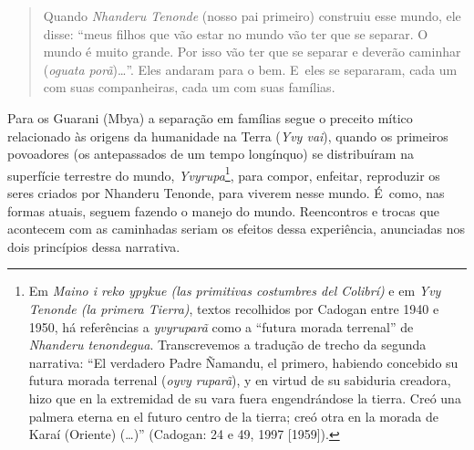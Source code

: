 \begin{quote}
Quando \emph{Nhanderu Tenonde} (nosso pai primeiro) construiu esse mundo, ele
disse: ``meus filhos que vão estar no mundo vão ter que se separar. O
mundo é muito grande. Por isso vão ter que se separar e deverão
caminhar (\emph{oguata porã})\ldots{}''. Eles andaram para o bem. E~eles se
separaram, cada um com suas companheiras, cada um com suas famílias. 
\end{quote}

Para os Guarani (Mbya) a separação em famílias segue o preceito mítico
relacionado às origens da humanidade na Terra (\emph{Yvy vai}), quando os
primeiros povoadores (os antepassados de um tempo longínquo) se
distribuíram na superfície terrestre do mundo, \emph{Yvyrupa}\footnote{Em
\emph{Maino i reko ypykue (las primitivas costumbres del Colibrí)} e em \emph{Yvy
Tenonde (la primera Tierra)}, textos recolhidos por Cadogan entre 1940 e
1950, há referências a \emph{yvyruparã} como a ``futura morada terrenal'' de
\emph{Nhanderu tenondegua}. Transcrevemos a tradução de trecho da segunda
narrativa: ``El verdadero Padre Ñamandu, el primero, habiendo concebido
su futura morada terrenal (\emph{oyvy ruparã}), y en virtud de su sabiduria
creadora, hizo que en la extremidad de su vara fuera engendrándose la
tierra. Creó una palmera eterna en el futuro centro de la tierra; creó
otra en la morada de Karaí (Oriente) (\ldots{})'' (Cadogan: 24 e 49, 1997
[1959]).}, para compor, enfeitar, reproduzir os seres criados por
Nhanderu Tenonde, para viverem nesse mundo. É~como, nas formas atuais,
seguem fazendo o manejo do mundo. Reencontros e trocas que acontecem
com as caminhadas seriam os efeitos dessa experiência, anunciadas nos
dois princípios dessa narrativa.

